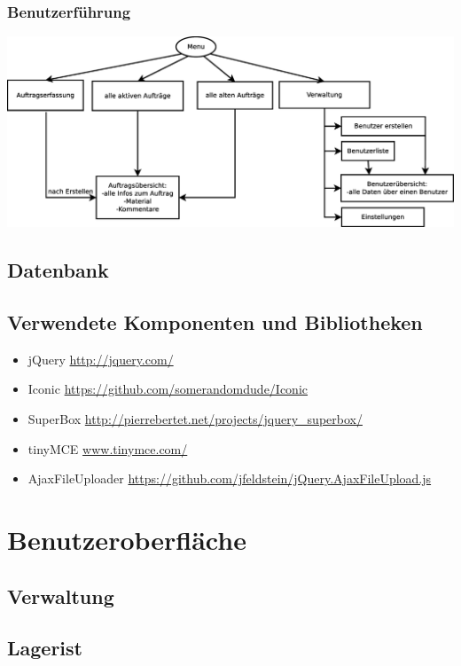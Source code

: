 \documentclass[ngerman, 12pt, pdftex]{scrartcl}[2006/07/30]
\begin{document}
	\subsubsection{Benutzerführung}
 \includegraphics[width=\textwidth]{navigation.eps}

\subsection{Datenbank}


\subsection{Verwendete Komponenten und Bibliotheken} %
\begin{itemize}
\item jQuery \url{http://jquery.com/}
\item Iconic \url{https://github.com/somerandomdude/Iconic}
\item SuperBox \url{http://pierrebertet.net/projects/jquery_superbox/}
\item tinyMCE \url{www.tinymce.com/}
\item AjaxFileUploader \url{https://github.com/jfeldstein/jQuery.AjaxFileUpload.js}
\end{itemize}



\section{Benutzeroberfläche}
\subsection{Verwaltung}

\subsection{Lagerist}
\end{document}
